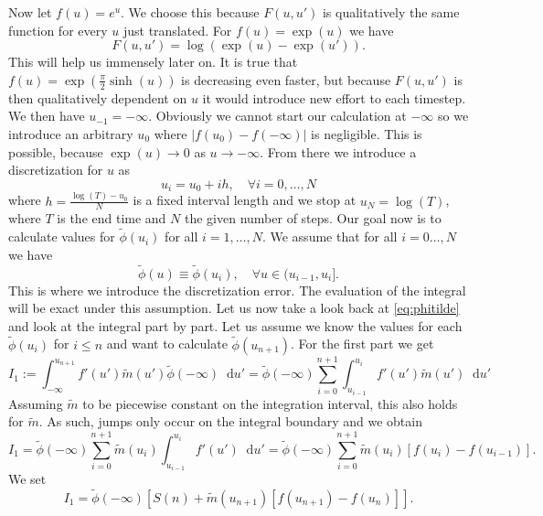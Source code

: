 \documentclass[12pt,a4paper,twoside, open=right]{scrreprt}
\theoremstyle{definition}
\theoremstyle{plain}
\newcommand{\abs}[1]{\left\vert #1\right\vert}
\newcommand{\D}{\mathop{}\!\mathrm{d}}
\begin{document}
Now let $f(u)=e^u$. We choose this because $F(u,u')$ is qualitatively the same function for every $u$ just translated. For $f(u)=\exp(u)$ we have
\begin{equation}
    F(u,u')=\log(\exp(u)-\exp(u')).
\end{equation}
This will help us immensely later on. It is true that $f(u)=\exp(\frac{\pi}{2}\sinh(u))$ is decreasing even faster, but because $F(u,u')$ is then qualitatively dependent on $u$ it would introduce new effort to each timestep. We then have $u_{-1}=-\infty$. Obviously we cannot start our calculation at $-\infty$ so we introduce an arbitrary $u_0$ where $\abs{f(u_0)-f(-\infty)}$ is negligible. This is possible, because $\exp(u)\to 0$ as $u\to-\infty$. From there we introduce a discretization for $u$ as
\begin{equation}
    u_i = u_0+ih,\quad\forall i=0,\dotsc,N
\end{equation}
where $h = \frac{\log(T) -u_0}{N}$ is a fixed interval length and we stop at $u_N=\log(T)$, where $T$ is the end time and $N$ the given number of steps. Our goal now is to calculate values for $\tilde\phi(u_i)$ for all $i=1,\dotsc,N$. We assume that for all $i=0\dotsc,N$ we have
\begin{equation}
    \tilde\phi(u) \equiv \tilde\phi(u_i), \quad\forall u\in(u_{i-1},u_i].
\end{equation}
This is where we introduce the discretization error. The evaluation of the integral will be exact under this assumption. Let us now take a look back at \eqref{eq:phitilde} and look at the integral part by part. Let us assume we know the values for each $\tilde\phi(u_i)$ for $i\le n$ and want to calculate $\tilde\phi(u_{n+1})$. For the first part we get
\begin{equation}
    I_1:=\int_{-\infty}^{u_{n+1}}f'(u')\tilde{m}(u')\tilde\phi(-\infty)\D u'=\tilde\phi(-\infty)\sum_{i=0}^{n+1}\int_{u_{i-1}}^{u_i}f'(u')\tilde{m}(u')\D u'
\end{equation}
Assuming $\tilde{m}$ to be piecewise constant on the integration interval, this also holds for $\tilde{m}$. As such, jumps only occur on the integral boundary and we obtain
\begin{equation}
    I_1 = \tilde{\phi}(-\infty)\sum_{i=0}^{n+1}\tilde{m}(u_i)\int_{u_{i-1}}^{u_i}f'(u')\D u' = \tilde{\phi}(-\infty)\sum_{i=0}^{n+1}\tilde{m}(u_i)[f(u_i)-f(u_{i-1})].
\end{equation}
We set 
\begin{equation}
    I_1 = \tilde\phi(-\infty)[S(n)+\tilde{m}(u_{n+1})[f(u_{n+1})-f(u_n)]].
\end{equation}
\end{document}
